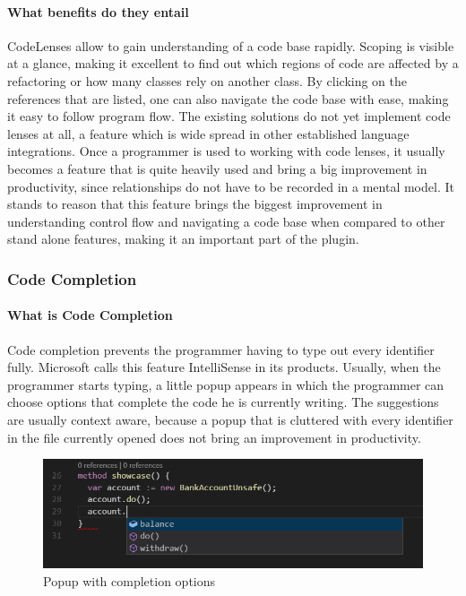 \paragraph{What benefits do they entail}
CodeLenses allow to gain understanding of a code base rapidly. Scoping is visible at a glance, making it excellent to find out which regions of code are affected by a refactoring or how many classes rely on another class. By clicking on the references that are listed, one can also navigate the code base with ease, making it easy to follow program flow. \newline
The existing solutions do not yet implement code lenses at all, a feature which is wide spread in other established language integrations. Once a programmer is used to working with code lenses, it usually becomes a feature that is quite heavily used and bring a big improvement in productivity, since relationships do not have to be recorded in a mental model. It stands to reason that this feature brings the biggest improvement in understanding control flow and navigating a code base when compared to other stand alone features, making it an  important part of the plugin.
\subsubsection{Code Completion} \label{agcodecompletion}
\paragraph{What is Code Completion}
Code completion prevents the programmer having to type out every identifier fully. Microsoft calls this feature IntelliSense in its products. Usually, when the programmer starts typing, a little popup appears in which the programmer can choose options that complete the code he is currently writing. The suggestions are usually context aware, because a popup that is cluttered with every identifier in the file currently opened does not bring an improvement in productivity.\newline
\begin{figure}[H]
	\centering
	\includegraphics[width=1\textwidth]{img/codeCompletionOverview}
	\caption{Popup with completion options}
	\label{fig:agcodecompletionoverview}
\end{figure}

